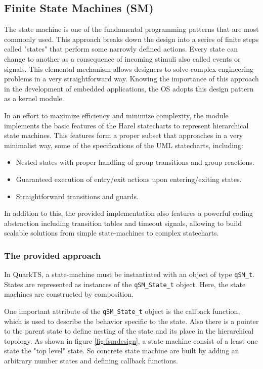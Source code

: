\subsection{Finite State Machines (SM)}
The state machine is one of the fundamental programming patterns that are most commonly used. This approach breaks down the design into a series of finite steps called "states" that perform some narrowly defined actions. Every state can change to another as a consequence of incoming stimuli also called events or signals. This elemental mechanism allows designers to solve complex engineering problems in a very straightforward way.
Knowing the importance of this approach in the development of embedded applications, the OS adopts this design pattern as a kernel module.

In an effort to maximize efficiency and minimize complexity, the module implements the basic features of the Harel statecharts to represent hierarchical state machines. This features form a proper subset that approaches in a very minimalist way, some of the specifications of the UML statecharts, including:

\begin{itemize}
    \item Nested states with proper handling of group transitions and group reactions.
    \item Guaranteed execution of entry/exit actions upon entering/exiting states.
    \item Straightforward transitions and guards.
\end{itemize} 

In addition to this, the provided implementation also features a powerful coding abstraction including transition tables and timeout signals, allowing to build scalable solutions from simple state-machines to complex statecharts. 

\subsubsection{The provided approach}

In QuarkTS, a state-machine must be instantiated with an object of type \lstinline{qSM_t}. States are represented as instances of the \lstinline{qSM_State_t} object. Here, the state machines are constructed by composition.



One important attribute of the \lstinline{qSM_State_t} object is the callback function, which is used to describe the behavior specific to the state. Also there is a pointer to the parent state to define nesting of the state and its place in the hierarchical topology.
As shown in figure \ref{fig:fsmdesign}, a state machine consist of a least one state the "top level" state.
So concrete state machine are built by adding an arbitrary number states and defining callback functions.

